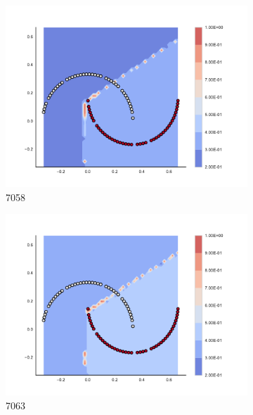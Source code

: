 \begin{figure}[h]
\begin{subfigure}[b]{0.09\textwidth}
    \includegraphics[clip, trim=2.35cm 1.75cm 4.5cm 0cm,width=\textwidth]{img/convergence/7058.pdf}
    \caption{7058}
    \label{fig:convergence_7058}
\end{subfigure}
%
\begin{subfigure}[b]{0.09\textwidth}
    \includegraphics[clip, trim=2.35cm 1.75cm 4.5cm 0cm,width=\textwidth]{img/convergence/7063.pdf}
    \caption{7063}
    \label{fig:convergence_7063}
\end{subfigure}
%
\begin{subfigure}[b]{0.09\textwidth}

\end{subfigure}
\end{figure}
